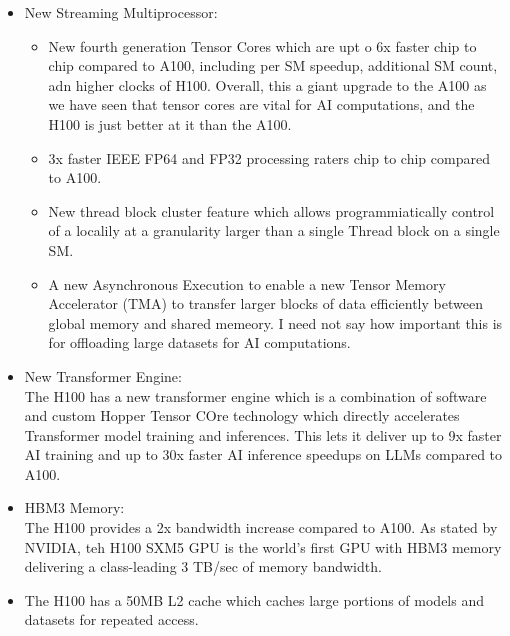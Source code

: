 \documentclass[12pt]{article}
\begin{document}
\begin{itemize}
    \item New Streaming Multiprocessor:
    \begin{itemize}
        \item New fourth generation Tensor Cores which are upt o 6x faster chip to chip compared to A100, including per SM speedup, additional SM count, adn higher clocks of H100. Overall, this a giant upgrade to the A100 as we have seen that tensor cores are vital for AI computations, and the H100 is just better at it than the A100. 
        \item 3x faster IEEE FP64 and FP32 processing raters chip to chip compared to A100.
        \item New thread block cluster feature which allows programmiatically control of a localily at a granularity larger than a single Thread block on a single SM. 
        \item A new Asynchronous Execution to enable a new Tensor Memory Accelerator (TMA) to transfer larger blocks of data efficiently between global memory and shared memeory. I need not say how important this is for offloading large datasets for AI computations.
    \end{itemize}
    \item New Transformer Engine:\\
    The H100 has a new transformer engine which is a combination of software and custom Hopper Tensor COre technology which directly accelerates Transformer model training and inferences. 
    This lets it deliver up to 9x faster AI training and up to 30x faster AI inference speedups on LLMs compared to A100.
    \item HBM3 Memory:\\
    The H100 provides a 2x bandwidth increase compared to A100. As stated by NVIDIA, teh H100 SXM5 GPU is the world's first GPU with HBM3 memory delivering a class-leading 3 TB/sec of memory bandwidth. 
    \item The H100 has a 50MB L2 cache which caches large portions of models and datasets for repeated access.
\end{itemize}
\end{document}
